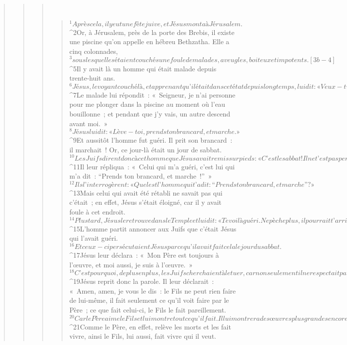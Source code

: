 \begin{verse}
\begin{verse}
\begin{verse}
         
      \bchapter{}
      \begin{verse}
${}^{1}Après cela, il y eut une fête juive, et Jésus monta à Jérusalem. 
${}^{2}Or, à Jérusalem, près de la porte des Brebis, il existe une piscine qu’on appelle en hébreu Bethzatha. Elle a cinq colonnades, 
${}^{3}sous lesquelles étaient couchés une foule de malades, aveugles, boiteux et impotents. [3b-4] 
${}^{5}Il y avait là un homme qui était malade depuis trente-huit ans. 
${}^{6}Jésus, le voyant couché là, et apprenant qu’il était dans cet état depuis longtemps, lui dit : « Veux-tu être guéri ? » 
${}^{7}Le malade lui répondit : « Seigneur, je n’ai personne pour me plonger dans la piscine au moment où l’eau bouillonne ; et pendant que j’y vais, un autre descend avant moi. » 
${}^{8}Jésus lui dit : « Lève-toi, prends ton brancard, et marche. » 
${}^{9}Et aussitôt l’homme fut guéri. Il prit son brancard : il marchait !
      Or, ce jour-là était un jour de sabbat. 
${}^{10}Les Juifs dirent donc à cet homme que Jésus avait remis sur pieds : « C’est le sabbat ! Il ne t’est pas permis de porter ton brancard. » 
${}^{11}Il leur répliqua : « Celui qui m’a guéri, c’est lui qui m’a dit : “Prends ton brancard, et marche !” » 
${}^{12}Ils l’interrogèrent : « Quel est l’homme qui t’a dit : “Prends ton brancard, et marche” ? » 
${}^{13}Mais celui qui avait été rétabli ne savait pas qui c’était ; en effet, Jésus s’était éloigné, car il y avait foule à cet endroit.
${}^{14}Plus tard, Jésus le retrouve dans le Temple et lui dit : « Te voilà guéri. Ne pèche plus, il pourrait t’arriver quelque chose de pire. » 
${}^{15}L’homme partit annoncer aux Juifs que c’était Jésus qui l’avait guéri. 
${}^{16}Et ceux-ci persécutaient Jésus parce qu’il avait fait cela le jour du sabbat.
${}^{17}Jésus leur déclara : « Mon Père est toujours à l’œuvre, et moi aussi, je suis à l’œuvre. » 
${}^{18}C’est pourquoi, de plus en plus, les Juifs cherchaient à le tuer, car non seulement il ne respectait pas le sabbat, mais encore il disait que Dieu était son propre Père, et il se faisait ainsi l’égal de Dieu.
${}^{19}Jésus reprit donc la parole. Il leur déclarait : « Amen, amen, je vous le dis : le Fils ne peut rien faire de lui-même, il fait seulement ce qu’il voit faire par le Père ; ce que fait celui-ci, le Fils le fait pareillement. 
${}^{20}Car le Père aime le Fils et lui montre tout ce qu’il fait. Il lui montrera des œuvres plus grandes encore, si bien que vous serez dans l’étonnement. 
${}^{21}Comme le Père, en effet, relève les morts et les fait vivre, ainsi le Fils, lui aussi, fait vivre qui il veut. 

\end{verse}
\end{verse}
\end{verse}
\end{verse}
